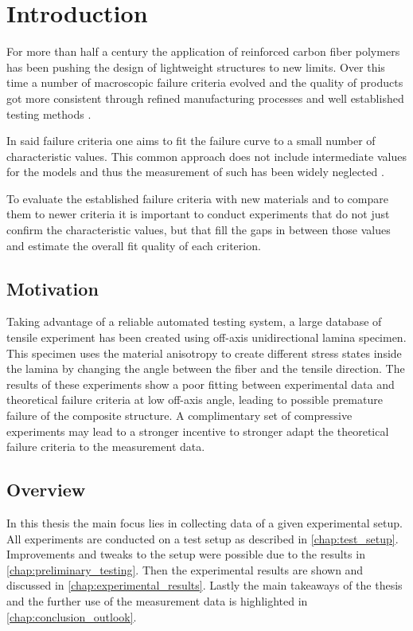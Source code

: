 \chapter{Introduction}
\label{chap:\currfilebase}

For more than half a century the application of reinforced carbon fiber polymers has been pushing the design of lightweight structures to new limits. Over this time a number of macroscopic failure criteria evolved and the quality of products got more consistent through refined manufacturing processes \cite{gurit2017guide} and well established testing methods \cite{calsson2014experimental}.

In said failure criteria one aims to fit the failure curve to a small number of characteristic values. This common approach does not include intermediate values for the models and thus the measurement of such has been widely neglected \cite{daniel2016yield}.

To evaluate the established failure criteria with new materials and to compare them to newer criteria \cite{daniel2007failure,daniel2016yield} it is important to conduct experiments that do not just confirm the characteristic values, but that fill the gaps in between those values and estimate the overall fit quality of each criterion.

\section{Motivation}
\label{sec:motivation}

Taking advantage of a reliable automated testing system, a large database of tensile experiment has been created using off-axis unidirectional lamina specimen. This specimen uses the material anisotropy to create different stress states inside the lamina by changing the angle between the fiber and the tensile direction. The results of these experiments show a poor fitting between experimental data and theoretical failure criteria at low off-axis angle, leading to possible premature failure of the composite structure. A complimentary set of compressive experiments may lead to a stronger incentive to stronger adapt the theoretical failure criteria to the measurement data.

\section{Overview}
\label{sec:overview}

In this thesis the main focus lies in collecting data of a given experimental setup. All experiments are conducted on a test setup as described in \autoref{chap:test_setup}. Improvements and tweaks to the setup were possible due to the results in \autoref{chap:preliminary_testing}. Then the experimental results are shown and discussed in \autoref{chap:experimental_results}. Lastly the main takeaways of the thesis and the further use of the measurement data is highlighted in \autoref{chap:conclusion_outlook}.